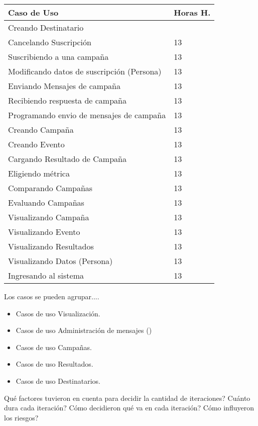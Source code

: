 \documentclass[a4paper, 11pt]{article}
\begin{document}
\begin{table}[H]
\centering
\begin{tabular}{ | p{10cm} | p{1cm} |}
\hline
Caso de Uso & Horas H.\\ \hline \hline
Creando Destinatario \\ \hline \hline
Cancelando Suscripci\'on& 13 \\ \hline
Suscribiendo a una campaña& 13 \\ \hline
Modificando datos de suscripci\'on (Persona)& 13 \\ \hline
Enviando Mensajes de campaña& 13 \\ \hline
Recibiendo respuesta de campaña& 13 \\ \hline
Programando envio de mensajes de campaña& 13 \\ \hline
Creando Campaña& 13 \\ \hline
Creando Evento& 13 \\ \hline
Cargando Resultado de Campaña& 13 \\ \hline
Eligiendo métrica& 13 \\ \hline
Comparando Campañas& 13 \\ \hline
Evaluando Campañas& 13 \\ \hline
Visualizando Campaña& 13 \\ \hline
Visualizando Evento& 13 \\ \hline
Visualizando Resultados & 13 \\ \hline
Visualizando Datos (Persona) & 13 \\ \hline
Ingresando al sistema & 13 \\ \hline

\end{tabular}
\end{table}
Los casos se pueden agrupar....
\begin{itemize}
\item Casos de uso Visualizaci\'on.
\item Casos de uso Administraci\'on de mensajes ()
\item Casos de uso Campa\~nas.
\item Casos de uso Resultados.
\item Casos de uso Destinatarios.
\end{itemize}
Qué factores tuvieron en cuenta para decidir la cantidad de iteraciones?
Cuánto dura cada iteración?
Cómo decidieron qué va en cada iteración?
Cómo influyeron los riesgos?
\end{document}
